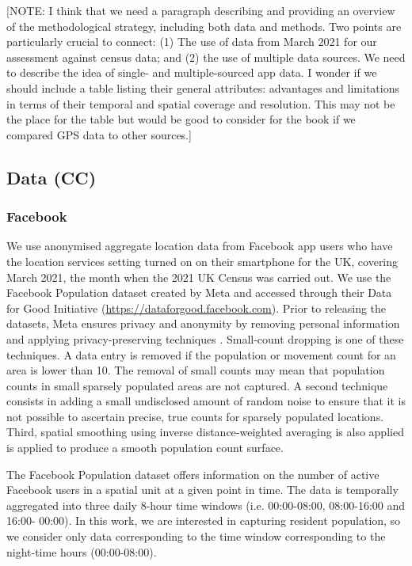 \documentclass[]{rsos}%
\begin{document}
{[}NOTE: I think that we need a paragraph describing and providing an
overview of the methodological strategy, including both data and
methods. Two points are particularly crucial to connect: (1) The use of
data from March 2021 for our assessment against census data; and (2) the
use of multiple data sources. We need to describe the idea of single-
and multiple-sourced app data. I wonder if we should include a table
listing their general attributes: advantages and limitations in terms of
their temporal and spatial coverage and resolution. This may not be the
place for the table but would be good to consider for the book if we
compared GPS data to other sources.{]}

\subsection{Data (CC)}\label{data-cc}

\subsubsection{Facebook}\label{facebook}

We use anonymised aggregate location data from Facebook app users who
have the location services setting turned on on their smartphone for the
UK, covering March 2021, the month when the 2021 UK Census was carried
out. We use the Facebook Population dataset created by Meta and accessed
through their Data for Good Initiative
(\url{https://dataforgood.facebook.com}). Prior to releasing the datasets,
Meta ensures privacy and anonymity by removing personal information and
applying privacy-preserving techniques \citep{maas2019} . Small-count
dropping is one of these techniques. A data entry is removed if the
population or movement count for an area is lower than 10. The removal
of small counts may mean that population counts in small sparsely
populated areas are not captured. A second technique consists in adding
a small undisclosed amount of random noise to ensure that it is not
possible to ascertain precise, true counts for sparsely populated
locations. Third, spatial smoothing using inverse distance-weighted
averaging is also applied is applied to produce a smooth population
count surface.

The Facebook Population dataset offers information on the number of
active Facebook users in a spatial unit at a given point in time. The
data is temporally aggregated into three daily 8-hour time windows (i.e.
00:00-08:00, 08:00-16:00 and 16:00- 00:00). In this work, we are
interested in capturing resident population, so we consider only data
corresponding to the time window corresponding to the night-time hours
(00:00-08:00).
\end{document}
